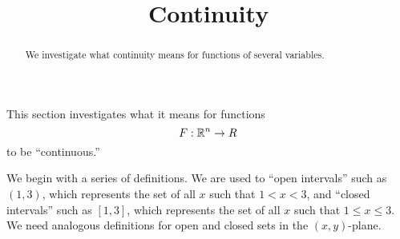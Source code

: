 \documentclass{ximera}
\title[Dig-In:]{Continuity}
\begin{document}
\begin{abstract}
We investigate what continuity means for functions of several variables.
\end{abstract}
\maketitle


This section investigates what it means for functions
\[
F:\mathbb R^n\to R
\]
to be ``continuous.''

We begin with a series of definitions. We are used to ``open
intervals'' such as $(1,3)$, which represents the set of all $x$ such
that $1<x<3$, and ``closed intervals'' such as $[1,3]$, which
represents the set of all $x$ such that $1\leq x\leq 3$. We need
analogous definitions for open and closed sets in the $(x,y)$-plane.






\end{document}

